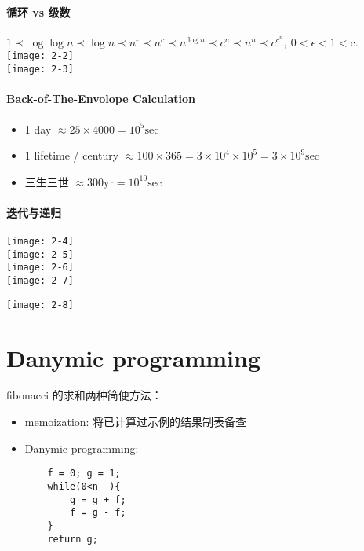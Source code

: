 \paragraph{循环 vs 级数}
$1 \prec \log \log n \prec \log n \prec n^{\epsilon} \prec n^{c} \prec n^{\log n} \prec c^{n} \prec n^{n} \prec c^{c^{n}},\ 0<\epsilon<1<\mathrm{c}$.\\
\texttt{[image: 2-2]}\\
\texttt{[image: 2-3]}

\paragraph{Back-of-The-Envolope Calculation}

\begin{itemize}
\item 1 day $\approx 25 \times 4000=10^ 5 \mathrm{sec}$
\item 1 lifetime / century $\approx 100 \times 365 =3 \times 10^4 \times 10^5 =3 \times 10^9 \mathrm{sec}$
\item 三生三世 $\approx 300 \mathrm{yr}=10^ {10} \mathrm{sec}$
\end{itemize}

\paragraph{迭代与递归}
\texttt{[image: 2-4]}\\
\texttt{[image: 2-5]}\\
\texttt{[image: 2-6]}\\
\texttt{[image: 2-7]}\\

\texttt{[image: 2-8]}\\

\section{Danymic programming}
fibonacci 的求和两种简便方法：
\begin{itemize}
\item memoization: 将已计算过示例的结果制表备查
\item Danymic programming: 
\begin{lstlisting}
    f = 0; g = 1;
    while(0<n--){
        g = g + f;
        f = g - f;
    }
    return g;
\end{lstlisting}
\end{itemize}

